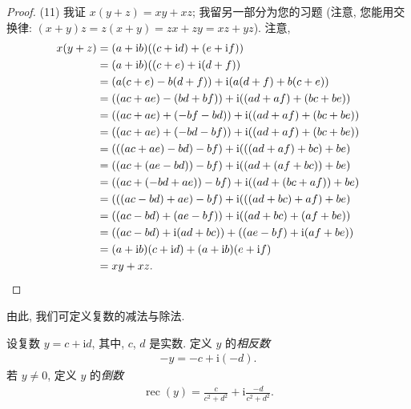 \documentclass[../libro.tex]{subfiles}
\begin{document}
\begin{proof}
    (11)
    我证 \(x (y + z) = x y + x z\);
    我留另一部分为您的习题
    (注意, 您能用交换律: \(
            (x + y) z = z (x + y) = z x + z y = x z + y z
    \)).
    注意,
    \begin{align*}
        x (y + z)
        = {} &
        (a + \mathrm{i} b)
        ((c + \mathrm{i} d) + (e + \mathrm{i} f))
        \\
        = {} &
        (a + \mathrm{i} b)
        ((c + e) + \mathrm{i} (d + f))
        \\
        = {} &
        (a (c + e) - b (d + f))
        + \mathrm{i} (a (d + f) + b (c + e))
        \\
        = {} &
        ((ac + ae) - (bd + bf))
        + \mathrm{i} ((ad + af) + (bc + be))
        \\
        = {} &
        ((ac + ae) + (-bf - bd))
        + \mathrm{i} ((ad + af) + (bc + be))
        \\
        = {} &
        ((ac + ae) + (-bd - bf))
        + \mathrm{i} ((ad + af) + (bc + be))
        \\
        = {} &
        (((ac + ae) - bd) - bf)
        + \mathrm{i} (((ad + af) + bc) + be)
        \\
        = {} &
        ((ac + (ae - bd)) - bf)
        + \mathrm{i} ((ad + (af + bc)) + be)
        \\
        = {} &
        ((ac + (-bd + ae)) - bf)
        + \mathrm{i} ((ad + (bc + af)) + be)
        \\
        = {} &
        (((ac - bd) + ae) - bf)
        + \mathrm{i} (((ad + bc) + af) + be)
        \\
        = {} &
        ((ac - bd) + (ae - bf))
        + \mathrm{i} ((ad + bc) + (af + be))
        \\
        = {} &
        ((ac - bd) + \mathrm{i} (ad + bc))
        + ((ae - bf) + \mathrm{i} (af + be))
        \\
        = {} &
        (a + \mathrm{i} b) (c + \mathrm{i} d)
        + (a + \mathrm{i} b) (e + \mathrm{i} f)
        \\
        = {} &
        x y + x z.
        \qedhere
    \end{align*}
\end{proof}

由此, 我们可定义复数的减法与除法.

\begin{definition}
    设复数 \(y = c + \mathrm{i} d\),
    其中, \(c\), \(d\) 是实数.
    定义 \(y\) 的\emph{相反数}
    \begin{align*}
        -y = -c + \mathrm{i} (-d).
    \end{align*}
    若 \(y \neq 0\), 定义 \(y\) 的\emph{倒数}
    \begin{align*}
        \operatorname{rec} {(y)}
        = \frac{c}{c^2 + d^2}
        + \mathrm{i} \frac{-d}{c^2 + d^2}.
    \end{align*}
\end{definition}
\end{document}
